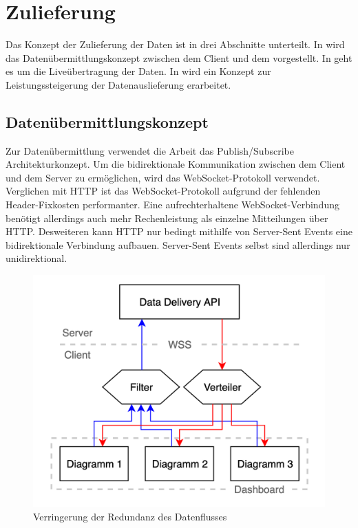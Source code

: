 \section{Zulieferung}
\label{sec:zulieferung}
Das Konzept der Zulieferung der Daten ist in drei Abschnitte
unterteilt. In  wird das Datenübermittlungskonzept
zwischen dem Client und dem  vorgestellt.
In  geht es um die Liveübertragung der Daten. In
 wird ein Konzept zur Leistungssteigerung der Datenauslieferung
erarbeitet.

\subsection{Datenübermittlungskonzept}
\label{subsec:datenuebermittlungskonzept}
Zur Datenübermittlung verwendet die Arbeit das Publish/Subscribe Architekturkonzept.
Um die bidirektionale Kommunikation zwischen dem Client und dem Server zu ermöglichen,
wird das WebSocket-Protokoll verwendet. Verglichen mit HTTP ist das WebSocket-Protokoll
aufgrund der fehlenden Header-Fixkosten performanter. Eine aufrechterhaltene WebSocket-Verbindung
benötigt allerdings auch mehr Rechenleistung als einzelne Mitteilungen über HTTP. Desweiteren
kann HTTP nur bedingt mithilfe von Server-Sent Events eine bidirektionale Verbindung aufbauen.
Server-Sent Events selbst sind allerdings nur unidirektional\cite[2. Abschnitt]{WebSocketVSSSE}.

\begin{figure}
    \begin{center}
    \includegraphics[scale=0.2]{img/abbildungen/Verteilung}
    \end{center}
    \caption{Verringerung der Redundanz des Datenflusses}
    \label{figure:uebersichtderdatenauslieferung}
\end{figure}

